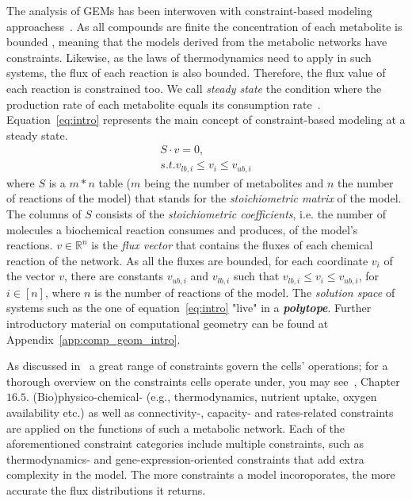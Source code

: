       
      The analysis of GEMs has been interwoven with constraint-based modeling approachess~\citep{lewis2012constraining}.
      As all compounds are finite the concentration of each metabolite is bounded \citep{palsson2015systems}, meaning that the models derived from the
      metabolic networks have constraints.
      Likewise, as the laws of thermodynamics need to apply in such systems, 
      the flux of each reaction is also bounded.
      Therefore, the flux value of each reaction is constrained too.
      We call 
      \textit{steady state} the condition where the production rate of each metabolite equals its consumption rate~\citep{cakmak2012new}. 
      Equation~\ref{eq:intro} represents the main concept of constraint-based modeling at a steady state.
      \begin{equation}
      \label{eq:intro}
         \begin{split}
               S \cdot v = 0 , \\
               s.t.  v_{lb,i} \le v_i \le v_{ub, i}
         \end{split}
       \end{equation}
      where
      $S$ is a $m*n$ table ($m$ being the number of metabolites and $n$ the number of reactions of the model) 
      that stands for the \textit{stoichiometric matrix} of the model.
      The columns of $S$ consists of the  
      \textit{stoichiometric coefficients}, 
      i.e. the number of molecules a biochemical reaction consumes and produces,
      of the model's reactions.          
      $v \in \mathbb{R}^n $ is the \textit{flux vector} that contains the fluxes
      of each chemical reaction of the network. 
      As all the fluxes are bounded, for each coordinate $v_i$ of the vector $v$,
      there are constants $v_{ub, i}$ and  $v_{lb, i}$
      such that $v_{lb,i} \le v_i \le v_{ub, i}$, for $i \in [n]$, 
      where $n$ is the number of reactions of the model.
      The \textit{solution space} of systems such as the one of equation~\ref{eq:intro} 
      "live" in a \textit{\textbf{polytope}}.
      Further introductory material on computational 
      geometry can be found at Appendix~\ref{app:comp_geom_intro}.

      As discussed in~\citep{reed2012shrinking} a great range of constraints 
      govern the cells' operations; for a thorough overview on the constraints cells operate under, you may see~\citep{palsson2015systems}, Chapter $16.5$. 
      (Bio)physico-chemical- (e.g., thermodynamics, nutrient uptake, oxygen availability etc.) as well as connectivity-, capacity- and rates-related constraints 
      are applied on the functions of such a metabolic network.
      Each of the aforementioned constraint categories include multiple constraints, such as 
      thermodynamics- and gene-expression-oriented constraints that add extra complexity 
      in the model. 
      The more constraints a model incoroporates, the more accurate the flux distributions it returns.

